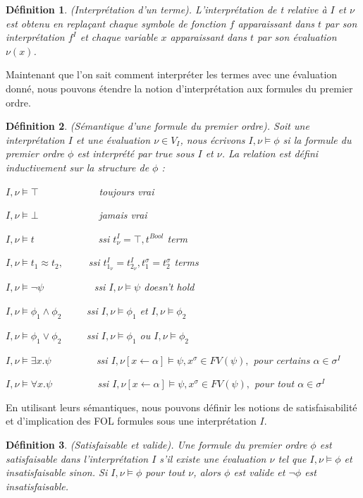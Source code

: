 \documentclass[9pt]{book}
\newtheorem{definition}{D\'efinition}[section]
\begin{document}
\begin{definition}
(Interpr\'etation d'un terme). L'interpr\'etation de t relative \`a $I$ et $\nu$ est obtenu en repla\c{c}ant chaque symbole de fonction $f$ apparaissant dans $t$ par son interpr\'etation $f^{I}$ et chaque variable $x$ apparaissant dans $t$ par son \'evaluation $\nu(x)$.
\end{definition}
Maintenant que l'on sait comment interpr\'eter les termes avec une \'evaluation donn\'e, nous pouvons \'etendre la notion d'interpr\'etation aux formules du premier ordre.
\begin{definition}
(S\'emantique d'une formule du premier ordre). Soit une interpr\'etation $I$ et une \'evaluation $\nu \in V_{I}$, nous \'ecrivons $I,\nu\models\phi$ si la formule du premier ordre $\phi$ est interpr\'et\'e par true sous $I$ et $\nu$. La relation est d\'efini inductivement sur la structure de $\phi$ :\par
$I,\nu\models\top$~~~~~~~~~~~~toujours vrai\par
$I,\nu\models\bot$~~~~~~~~~~~~jamais vrai\par
$I,\nu\models t$~~~~~~~~~~~~ ssi $t^{I}_{\nu}=\top,t^{Bool}$ term\par
$I,\nu\models t_{1}\approx t_{2},$~~~~~ssi $t^{I}_{1_{\nu}}=t^{I}_{2_{\nu}},t^{\sigma}_{1}=t^{\sigma}_{2}$ terms\par
$I,\nu\models\neg\psi$~~~~~~~~~~ssi $I,\nu\models\psi$ doesn't hold\par
$I,\nu\models\phi_{1}\land\phi_{2}$~~~~~ssi $I,\nu\models\phi_{1}$ et $I,\nu\models\phi_{2}$\par
$I,\nu\models\phi_{1}\lor\phi_{2}$~~~~~ssi $I,\nu\models\phi_{1}$ ou $I,\nu\models\phi_{2}$\par
$I,\nu\models\exists x.\psi$~~~~~~~~~ssi $I,\nu[x\leftarrow\alpha]\models\psi, x^{\sigma}\in FV(\psi),$ pour certains $\alpha\in\sigma^{I}$\par
$I,\nu\models\forall x.\psi$~~~~~~~~~ssi $I,\nu[x\leftarrow\alpha]\models\psi, x^{\sigma}\in FV(\psi),$ pour tout $\alpha\in\sigma^{I}$
\end{definition}

En utilisant leurs s\'emantiques, nous pouvons d\'efinir les notions de satisfaisabilit\'e  et d'implication des FOL formules sous une interpr\'etation $I$.

\begin{definition}
(Satisfaisable et valide). Une formule du premier ordre $\phi$ est satisfaisable dans l'interpr\'etation $I$ s'il existe une \'evaluation $\nu$ tel que $I,\nu\models\phi$ et insatisfaisable sinon. Si $I,\nu\models\phi$ pour tout $\nu$, alors $\phi$ est valide et $\neg\phi$ est insatisfaisable.
\end{definition}
\end{document}
